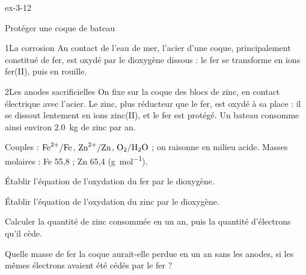 \begin{blocLivre}{ex-3-12}
\begin{exercice}[3]{Protéger une coque de bateau}
\begin{docu}{1}{La corrosion}
Au contact de l'eau de mer, l'acier d'une coque, principalement constitué de fer, est oxydé par le dioxygène dissous :
le fer se transforme en ions fer(II), puis en rouille.
\end{docu}
\begin{docu}{2}{Les anodes sacrificielles}
On fixe sur la coque des blocs de zinc, en contact électrique avec l'acier. Le zinc, plus réducteur que le fer, est oxydé à
sa place : il se dissout lentement en ions zinc(II), et le fer est protégé. Un bateau consomme ainsi environ \qty{2,0}{kg} de
zinc par an.
\end{docu}
\begin{donnees}
Couples : $\ce{Fe^{2+}}/\ce{Fe}$, $\ce{Zn^{2+}}/\ce{Zn}$, $\ce{O2}/\ce{H2O}$ ; on raisonne en milieu acide. Masses molaires : Fe 55,8 ; Zn 65,4 (\unit{g.mol^{-1}}).
\end{donnees}
\begin{questions}
\item Établir l'équation de l'oxydation du fer par le dioxygène.
\item Établir l'équation de l'oxydation du zinc par le dioxygène.
\item Calculer la quantité de zinc consommée en un an, puis la quantité d'électrons qu'il cède.
\item \initiative Quelle masse de fer la coque aurait-elle perdue en un an sans les anodes, si les mêmes électrons avaient
été cédés par le fer ?
\end{questions}
\end{exercice}
\end{blocLivre}
